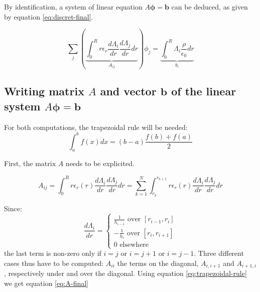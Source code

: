 \documentclass[a4paper,12pt,twoside]{article}
\newcommand{\mbf}[1]{\mathbf{#1}} %
\newcommand{\bracket}[1]{\left(#1\right)}
\begin{document}
  By identification, a system of linear equation $A\mbf{\phi}=\mbf{b}$ can be deduced, as given by equation \eqref{eq:discret-final}.

  \begin{equation}
    \sum_j\bracket{\underbrace{\int_0^R r\epsilon_r\frac{d\Lambda_i}{dr}\frac{d\Lambda_j}{dr}dr}_{A_{ij}}}\phi_j = \underbrace{\int_0^R \Lambda_i\frac{\rho}{\epsilon_0}dr}_{b_i}
    \label{eq:discret-final}
  \end{equation}



  \subsection{Writing matrix $A$ and vector $\mbf{b}$ of the linear system $A\mbf{\phi}=\mbf{b}$}\label{sec:writing-A-b1} %

  For both computations, the trapezoidal rule will be needed:
  \begin{equation}
    \int_a^b f\bracket{x}dx = \bracket{b-a}\frac{f\bracket{b} + f\bracket{a}}{2}
    \label{eq:trapezoidal-rule}
  \end{equation}

  First, the matrix $A$ needs to be explicited.

  \begin{equation*}
   A_{ij} = \int_0^R r\epsilon_r(r)\frac{d\Lambda_i}{dr}\frac{d\Lambda_j}{dr}dr = \sum_{k=1}^N \int_{r_{k}}^{r_{k+1}}r \epsilon_r(r)\frac{d\Lambda_i}{dr}\frac{d\Lambda_j}{dr}dr
  \end{equation*}

  Since:
  \begin{equation}
   \frac{d\Lambda_i}{dr}= \begin{cases}
   \frac{1}{h_{i-1}} \text{ over } [r_{i-1},r_i]\\
   -\frac{1}{h_{i}} \text{ over } [r_i,r_{i+1}]\\
   0 \text{ elsewhere}
                          \end{cases}
    \label{eq:lambderiv}
  \end{equation}the last term is non-zero only if $i=j$ or $i=j+1$ or $i=j-1$. Three different cases thus have to be computed: $A_{ii}$ the terms on the diagonal, $A_{i,i+1}$ and $A_{i+1,i}$, respectively under and over the diagonal. Using equation \eqref{eq:trapezoidal-rule} we get equation \eqref{eq:A-final}
\end{document}
